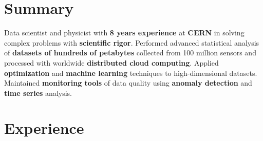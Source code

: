 \documentclass{myfancycv}
\begin{document}
\makeheader
\vspace*{-.35em}

  \vspace*{-0.5em}
\section{Summary}

Data scientist and physicist with {\bf 8 years experience} at {\bf CERN} in solving complex problems with {\bf scientific rigor}.
Performed advanced statistical analysis of {\bf datasets of hundreds of petabytes} collected from 100 million sensors and processed with worldwide {\bf distributed cloud computing}. Applied {\bf optimization} and {\bf machine learning} techniques to high-dimensional datasets. Maintained {\bf monitoring tools} of data quality using {\bf anomaly detection} and {\bf time series} analysis.

\section{Experience}
\end{document}

